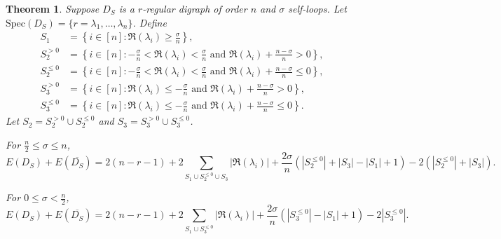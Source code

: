 \documentclass[12pt,a4paper,reqno]{amsart}
\numberwithin{equation}{section}
\theoremstyle{plain}
\newtheorem{theorem}{Theorem}[section]
\theoremstyle{definition}
\newcommand{\<}{\langle}
\renewcommand{\>}{\rangle}
\begin{document}
    \begin{theorem}
        \label{sum_of_E_and_E_comp}
        Suppose $D_S$ is a $r$-regular digraph of order $n$ and $\sigma$ self-loops. Let $\mathrm{Spec}(D_S)=\{r=\lambda_1, \ldots, \lambda_n\}$. Define 
        \begin{align*}
            S_1 &= \left\{ i \in [n] : \Re(\lambda_i) \geq \frac{\sigma}{n}   \right\}, \\
            S_2^{>0} &= \left\{ i \in [n] : -\frac{\sigma}{n} < \Re(\lambda_i) < \frac{\sigma}{n} \text{ and } \Re(\lambda_i) + \frac{n-\sigma}{n} > 0  \right\}, \\
            S_2^{\leq0} &= \left\{ i \in [n] : -\frac{\sigma}{n} <\Re(\lambda_i) < \frac{\sigma}{n} \text{ and } \Re(\lambda_i) + \frac{n-\sigma}{n} \leq 0  \right\}, \\
            S_3^{>0} &= \left\{ i \in [n] : \Re(\lambda_i) \leq -\frac{\sigma}{n} \text{ and } \Re(\lambda_i) + \frac{n-\sigma}{n} > 0  \right\}, \\
            S_3^{\leq 0} &= \left\{ i \in [n] : \Re(\lambda_i) \leq -\frac{\sigma}{n} \text{ and } \Re(\lambda_i) + \frac{n-\sigma}{n} \leq 0   \right\}.
        \end{align*}
        Let $S_2= S_2^{>0} \cup S_2^{\leq 0} $ and $S_3= S_3^{>0} \cup S_3^{\leq 0} $.
        
        For $\frac{n}{2} \leq \sigma \leq n $,
        \begin{equation}
            \label{energy_sum_complement_1}
            E(D_S)+E(\overline{D_S})= 2(n-r-1)+2\sum_{S_1 \cup S_2^{\leq 0} \cup S_3 }|\Re(\lambda_i)|+\frac{2\sigma}{n}(|S_2^{\leq 0}|+|S_3|-|S_1|+1) -2(|S_2^{\leq 0}|+|S_3|).
        \end{equation}

        For $0\leq\sigma < \frac{n}{2}$,
        \begin{equation}
         \label{energy_sum_complement_2}
            E(D_S)+E(\overline{D_S}) = 2(n-r-1)+2\sum_{S_1 \cup S_3^{\leq 0} }|\Re(\lambda_i)|+ \frac{2\sigma}{n}(|S_3^{\leq 0}|-|S_1|+1) -2|S_3^{\leq 0}|.
        \end{equation}
    \end{theorem}
\end{document}
